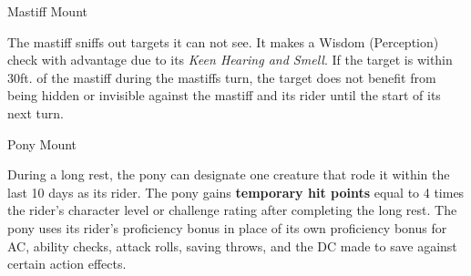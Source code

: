 \documentclass[letterpaper,twocolumn,openany,nodeprecatedcode]{dndbook}
\begin{document}
\begin{DndMonster}[float*=b,width=\textwidth + 8pt]{Mastiff Mount}
\begin{multicols}{2}
    The mastiff sniffs out targets it can not see. It makes a Wisdom (Perception) check with advantage due to its \textit{Keen Hearing and Smell}. If the target is within 30ft. of the mastiff during the mastiffs turn, the target does not benefit from being hidden or invisible against the mastiff and its rider until the start of its next turn.

  \end{multicols}
\end{DndMonster}

\begin{DndMonster}[float*=b,width=\textwidth + 8pt]{Pony Mount}
  \begin{multicols}{2}

    \DndMonsterBasics[
        armor-class = {10 + PB},
        hit-points  = {\DndDice{2d8 + 2}},
        speed       = {40 ft.},
      ]

    \DndMonsterAbilityScores[
        str = 15,
        dex = 10,
        con = 13,
        int = 2,
        wis = 11,
        cha = 7,
      ]

    \DndMonsterDetails[
        senses = {passive Perception 10},
        languages = {-},
        challenge = 1/8,
      ]

    During a long rest, the pony can designate one creature that rode it within the last 10 days as its rider. The pony gains \textbf{temporary hit points} equal to 4 times the rider’s character level or challenge rating after completing the long rest. The pony uses its rider’s proficiency bonus in place of its own proficiency bonus for AC, ability checks, attack rolls, saving throws, and the DC made to save against certain action effects.


    \DndMonsterAttack[
      name=Combat Stomp,
      distance=melee, %
      mod={+2 + PB},
      dmg=\DndDice{2d4 + 2},
      dmg-type=bludgeoning,
      extra={. If the target is a Medium or smaller creature, it must succeed on a DC 10 + PB Strength saving throw or be knocked prone.}
    ]


\end{multicols}
\end{DndMonster}
\end{document}
